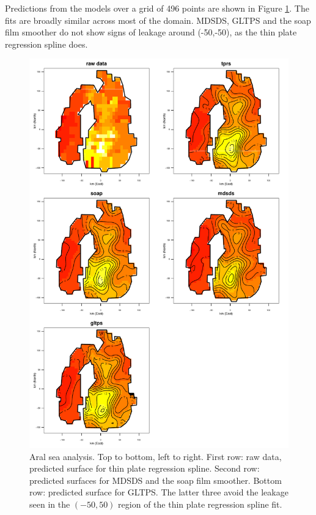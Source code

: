 \documentclass[useAMS, referee]{biom}
\begin{document}
Predictions from the models over a grid of 496 points are shown in Figure \ref{aral-plot}. The fits are broadly similar across most of the domain. MDSDS, GLTPS and the soap film smoother do not show signs of leakage around (-50,-50), as the thin plate regression spline does.



\begin{figure}
\centering
\includegraphics[width=\textwidth]{examples/aral/aral-plot.pdf}
\caption{Aral sea analysis. Top to bottom, left to right. First row: raw data, predicted surface for thin plate regression spline. Second row: predicted surfaces for MDSDS and the soap film smoother. Bottom row: predicted surface for GLTPS. The latter three avoid the leakage seen in the $(-50, 50)$ region of the thin plate regression spline fit.}
\label{aral-plot}
\end{figure}
\end{document}
